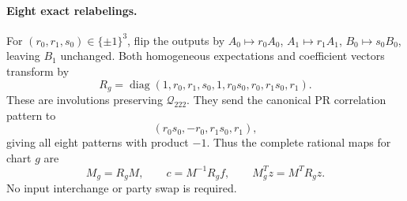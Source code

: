 \documentclass[11pt]{article}
\begin{document}
\paragraph{Eight exact relabelings.}
For $(r_0,r_1,s_0)\in\{\pm1\}^3$, flip the outputs by
$A_0\mapsto r_0A_0$, $A_1\mapsto r_1A_1$, $B_0\mapsto s_0B_0$,
leaving $B_1$ unchanged. Both homogeneous expectations and coefficient
vectors transform by
\begin{equation}
 R_g=\operatorname{diag}(1,r_0,r_1,s_0,1,r_0s_0,r_0,r_1s_0,r_1).
                                                               \label{eq:flips}
\end{equation}
These are involutions preserving $\mathcal Q_{222}$. They send the
canonical PR correlation pattern to
\[
                  (r_0s_0,-r_0,r_1s_0,r_1),
\]
giving all eight patterns with product $-1$.
Thus the complete rational maps for chart $g$ are
\begin{equation}
 M_g=R_gM,\qquad c=M^{-1}R_gf,\qquad
 M_g^Tz=M^TR_gz.                                        \label{eq:chart-map}
\end{equation}
No input interchange or party swap is required.
\end{document}
